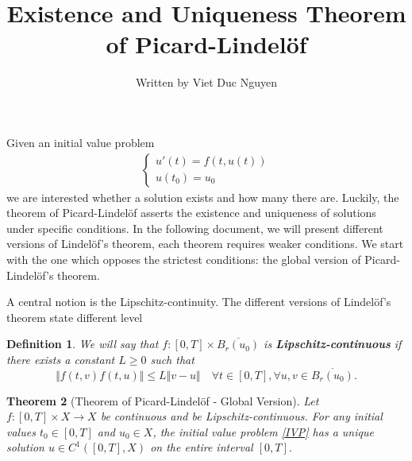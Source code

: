 \documentclass[a4paper, 11pt]{article}
\newtheorem{theorem}{Theorem}
\newtheorem{definition}[theorem]{Definition}
\begin{document}
\title{Existence and Uniqueness Theorem of Picard-Lindelöf}
\author{ Written by Viet Duc Nguyen}
\maketitle


Given an initial value problem
\begin{align}\label{IVP}
	\begin{cases}
		u'(t) = f(t, u(t)) \\ u(t_0) = u_0
	\end{cases}
\end{align}
we are interested whether a solution exists and how many there are. Luckily, the theorem of Picard-Lindelöf asserts the existence and uniqueness of solutions under specific conditions. In the following document, we will present different versions of Lindelöf's theorem, each theorem requires weaker conditions. We start with the one which opposes the strictest conditions: the global version of Picard-Lindelöf's theorem.

A central notion is the Lipschitz-continuity. The different versions of Lindelöf's theorem state different level
\begin{definition}
	We will say that $f: [0,T] \times \overline{B_r(u_0)}$ is \textbf{Lipschitz-continuous} if there exists a constant $L \geq 0$ such that
	\[
	\Vert f(t,v) f(t,u) \Vert \leq L \Vert v-u \Vert \quad \forall t \in [0,T], \forall u,v \in  \overline{B_r(u_0)}.
	\]
\end{definition}

\begin{theorem}[Theorem of Picard-Lindelöf - Global Version]
	Let $f: [0,T] \times X \to X$ be continuous and be Lipschitz-continuous. For any initial values $t_0 \in [0,T]$ and $u_0 \in X$, the initial value problem \eqref{IVP} has a unique solution $u \in C^1([0,T], X)$ on the entire interval $[0,T]$.
\end{theorem}
\end{document}
